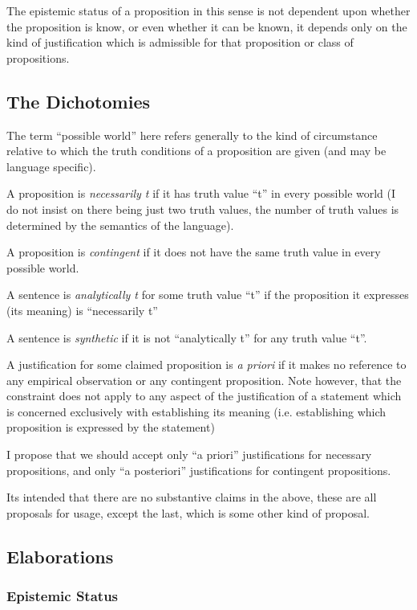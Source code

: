 The epistemic status of a proposition in this sense is not dependent upon whether the proposition is know, or even whether it can be known, it depends only on the kind of justification which is admissible for that proposition or class of propositions.

\subsection{The Dichotomies}

The term ``possible world'' here refers generally to the kind of circumstance relative to which the truth conditions of a proposition are given (and may be language specific).

A proposition is {\it necessarily t} if it has truth value ``t'' in every possible world (I do not insist on there being just two truth values, the number of truth values is determined by the semantics of the language).

A proposition is {\it contingent} if it does not have the same truth value in every possible world.

A sentence is {\it analytically t} for some truth value ``t''	if the proposition it expresses (its meaning) is ``necessarily t''

A sentence is {\it synthetic} if it is not ``analytically t'' for any truth value ``t''.

A justification for some claimed proposition is {\it a priori} if it makes no reference to any empirical observation or any contingent proposition.
Note however, that the constraint does not apply to any aspect of the justification of a statement	which is concerned exclusively with establishing its meaning (i.e. establishing which proposition is expressed by the statement)

I propose that we should accept only ``a priori'' justifications for necessary propositions, and only ``a posteriori'' justifications for contingent propositions.





Its intended that there are no substantive claims in the above, these
are all proposals for usage, except the last, which is some other
kind of proposal.

\subsection{Elaborations}

\subsubsection{Epistemic Status}

